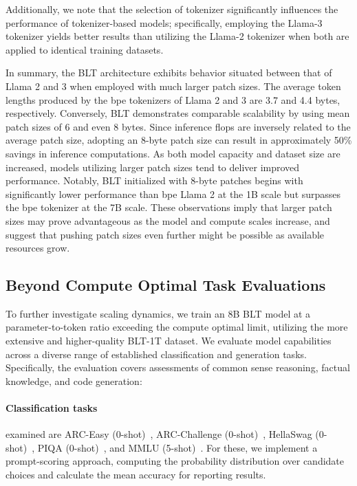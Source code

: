 Additionally, we note that the selection of tokenizer significantly influences the performance of tokenizer-based models; specifically, employing the Llama-3 tokenizer yields better results than utilizing the Llama-2 tokenizer when both are applied to identical training datasets.

In summary, the {\textsc BLT} architecture exhibits behavior situated between that of Llama 2 and 3 when employed with much larger patch sizes. The average token lengths produced by the bpe tokenizers of Llama 2 and 3 are 3.7 and 4.4 bytes, respectively. Conversely, {\textsc BLT} demonstrates comparable scalability by using mean patch sizes of 6 and even 8 bytes. Since inference flops are inversely related to the average patch size, adopting an 8-byte patch size can result in approximately 50\% savings in inference computations. As both model capacity and dataset size are increased, models utilizing larger patch sizes tend to deliver improved performance. Notably, {\textsc BLT} initialized with 8-byte patches begins with significantly lower performance than bpe Llama 2 at the 1B scale but surpasses the bpe tokenizer at the 7B scale. These observations imply that larger patch sizes may prove advantageous as the model and compute scales increase, and suggest that pushing patch sizes even further might be possible as available resources grow.

\subsection{Beyond Compute Optimal Task Evaluations}
\label{section:evals}
To further investigate scaling dynamics, we train an 8B {\textsc BLT} model at a parameter-to-token ratio exceeding the compute optimal limit, utilizing the more extensive and higher-quality {\textsc BLT}-1T dataset. We evaluate model capabilities across a diverse range of established classification and generation tasks. Specifically, the evaluation covers assessments of common sense reasoning, factual knowledge, and code generation:

\paragraph{Classification tasks} examined are ARC-Easy (0-shot)~\citep{Eval_ARC}, ARC-Challenge (0-shot)~\citep{Eval_ARC}, HellaSwag (0-shot)~\citep{Eval_hellaswag}, PIQA (0-shot)~\citep{Eval_piqa}, and MMLU (5-shot)~\citep{hendrycks2020measuring}. For these, we implement a prompt-scoring approach, computing the probability distribution over candidate choices and calculate the mean accuracy for reporting results.


